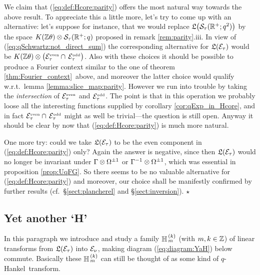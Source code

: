 \begin{remark}\label{rem:Fourier:construction:parity} \rm
We claim that (\ref{eq:def:Hcore:parity}) offers the most natural way towards the above result.
To appreciate this a little more, let's try to come up with an alternative:
let's suppose for instance, that we would replace
$\calL \! \left({\mathcal S}_\tau(\RR^+;q^2)\vertM \right)$ by the space
$K(\mathbb{Z} \theta) \otimes {\mathcal S}_\tau (\mathbb{R}^+;q)$ proposed in remark \ref{rem:parity}.iii\@.
In view of (\ref{eq:qSchwartz:not_direct_sum})
the corresponding alternative for $\mathfrak{L}(\mathcal E_\tau)$ would be
$\KZ \tens \left(\Hcore_\tau^\scripteven \cap \,\Hcore_\tau^\scriptodd \vertM \right)$.
Also with these choices it should be possible to produce a Fourier context
similar to the one of theorem \ref{thm:Fourier_context}\ above,
and moreover the latter choice would qualify w.r.t.\ lemma \ref{lemma:slice_map:parity}\@.
However we run into trouble by taking the {\em intersection\/} of
$\mathcal E_\tau^{\rm \scriptscriptstyle even}$ and $\mathcal E_\tau^{\rm \scriptscriptstyle odd}$.
The point is that in this operation we probably loose all the interesting
functions supplied by corollary \ref{cor:qExp_in_Hcore}, and in fact
$\mathcal E_\tau^{\rm \scriptscriptstyle even} \cap \, \mathcal E_\tau^{\rm \scriptscriptstyle odd} $ might as well be
trivial---the question is still open. Anyway it should be clear by
now that (\ref{eq:def:Hcore:parity}) is much more natural.

One more try: could we take $\mathfrak{L}(\mathcal E_\tau)$ to be the even
component in (\ref{eq:def:Hcore:parity}) only? Again the answer is
negative, since then $\mathfrak{L}(\mathcal E_\tau)$ would no longer be invariant under
$\Gamma \otimes \Omega^{\pm 1}$ or $\Gamma^{-1} \otimes \Omega^{\pm 1}$,
which was essential in proposition \ref{prop:UqFG}\@.
So there seems to be no valuable alternative for (\ref{eq:def:Hcore:parity})
and moreover, our choice shall be manifestly confirmed by further results
(cf.\ \S\ref{sect:plancherel} and \S\ref{sect:inversion}).
\hfill $\star$
\end{remark}




\subsection{Yet another \lq H\rq}

In this paragraph we introduce and study a family $\mathbb{H}_{\,m}^{\,(k)}$ (with $m,k\in\mathbb{Z}$)
of linear transforms from $\mathfrak{L}(\mathcal E_\tau)$ into $\mathcal E_\nu$,
making diagram (\ref{eq:diagram:YaH}) below commute. Basically these
$\mathbb{H}_{\,m}^{\,(k)}$ can still be thought of as some kind of \mbox{$q$-Hankel}\ transform.

